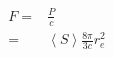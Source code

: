 \documentclass[10pt,fleqn]{article}
\newcommand{\eqar}[1]
{
  \begin{align*}
    #1
  \end{align*}
}
\newcommand{\angl}[1]{{\left\langle{#1}\right\rangle}}
\begin{document}
\subsection{}
\eqar{
  F=&\frac{P}{c}\\
  =&\angl{S}\frac{8\pi}{3c}r_e^2
}

\section{}
\subsection{}

\section{}

\section{}
\subsection{}
\subsection{}
\subsection{}
\subsection{}
\subsection{}
\end{document}
